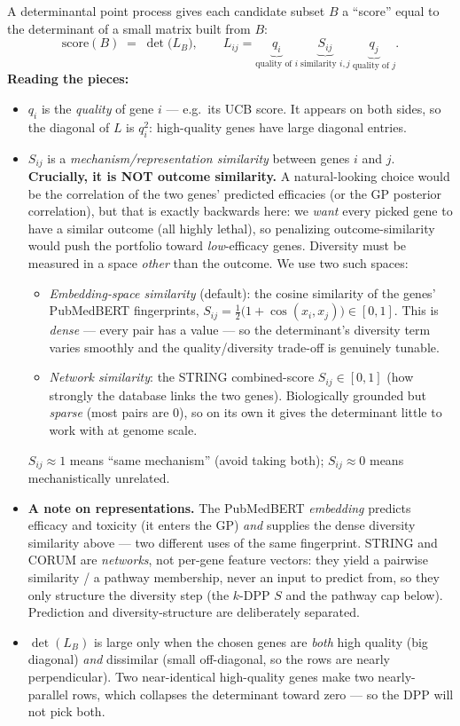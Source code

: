 \documentclass[11pt]{article}
\begin{document}
A determinantal point process gives each candidate subset $B$ a ``score'' equal to the
determinant of a small matrix built from $B$:
\begin{equation}
\text{score}(B)\;=\;\det\!\big(L_B\big),\qquad L_{ij}=\underbrace{q_i}_{\text{quality of }i}\ \underbrace{S_{ij}}_{\text{similarity }i,j}\ \underbrace{q_j}_{\text{quality of }j} .
\end{equation}
\textbf{Reading the pieces:}
\begin{itemize}[leftmargin=2em,itemsep=1pt]
\item $q_i$ is the \emph{quality} of gene $i$ --- e.g.\ its UCB score. It appears on both sides,
so the diagonal of $L$ is $q_i^2$: high-quality genes have large diagonal entries.
\item $S_{ij}$ is a \emph{mechanism/representation similarity} between genes $i$ and $j$.
\textbf{Crucially, it is NOT outcome similarity.} A natural-looking choice would be the
correlation of the two genes' predicted efficacies (or the GP posterior correlation), but
that is exactly backwards here: we \emph{want} every picked gene to have a similar outcome
(all highly lethal), so penalizing outcome-similarity would push the portfolio toward
\emph{low}-efficacy genes. Diversity must be measured in a space \emph{other} than the
outcome. We use two such spaces:
\begin{itemize}[leftmargin=1.5em,itemsep=0pt]
\item[(a)] \emph{Embedding-space similarity} (default): the cosine similarity of the genes'
PubMedBERT fingerprints, $S_{ij}=\tfrac12\big(1+\cos(x_i,x_j)\big)\in[0,1]$. This is
\emph{dense} --- every pair has a value --- so the determinant's diversity term varies
smoothly and the quality/diversity trade-off is genuinely tunable.
\item[(b)] \emph{Network similarity}: the STRING combined-score $S_{ij}\in[0,1]$ (how
strongly the database links the two genes). Biologically grounded but \emph{sparse} (most
pairs are $0$), so on its own it gives the determinant little to work with at genome scale.
\end{itemize}
$S_{ij}\approx 1$ means ``same mechanism'' (avoid taking both); $S_{ij}\approx 0$ means
mechanistically unrelated.
\item \textbf{A note on representations.} The PubMedBERT \emph{embedding} predicts efficacy
and toxicity (it enters the GP) \emph{and} supplies the dense diversity similarity above ---
two different uses of the same fingerprint. STRING and CORUM are \emph{networks}, not
per-gene feature vectors: they yield a pairwise similarity / a pathway membership, never an
input to predict from, so they only structure the diversity step (the $k$-DPP $S$ and the
pathway cap below). Prediction and diversity-structure are deliberately separated.
\item $\det(L_B)$ is large only when the chosen genes are \emph{both} high quality (big
diagonal) \emph{and} dissimilar (small off-diagonal, so the rows are nearly perpendicular).
Two near-identical high-quality genes make two nearly-parallel rows, which collapses the
determinant toward zero --- so the DPP will not pick both.
\end{itemize}
\end{document}
